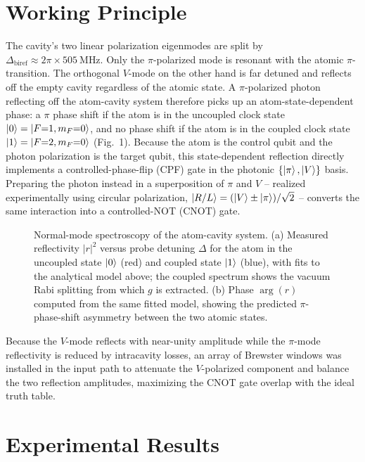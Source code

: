 \documentclass[10pt,a4paper]{article}
\begin{document}
\section*{Working Principle}

The cavity's two linear polarization eigenmodes are split by $\Delta_{\text{biref}} \approx 2\pi\times\SI{505}{\mega\hertz}$. Only the $\pi$-polarized mode is resonant with the atomic $\pi$-transition. The orthogonal $V$-mode on the other hand is far detuned and reflects off the empty cavity regardless of the atomic state. A $\pi$-polarized photon reflecting off the atom-cavity system therefore picks up an atom-state-dependent phase: a $\pi$ phase shift if the atom is in the uncoupled clock state $\ket{0}=\ket{F{=}1,m_F{=}0}$, and no phase shift if the atom is in the coupled clock state $\ket{1}=\ket{F{=}2,m_F{=}0}$ (Fig.~1). Because the atom is the control qubit and the photon polarization is the target qubit, this state-dependent reflection directly implements a controlled-phase-flip (CPF) gate in the photonic $\{\ket{\pi},\ket{V}\}$ basis. Preparing the photon instead in a superposition of $\pi$ and $V$ -- realized experimentally using circular polarization, $\ket{R/L} = (\ket{V}\pm\ket{\pi})/\sqrt{2}$ -- converts the same interaction into a controlled-NOT (CNOT) gate.

\begin{figure}[!htb]
	\centering
	
	\caption{Normal-mode spectroscopy of the atom-cavity system. (a) Measured reflectivity $|r|^2$ versus probe detuning $\Delta$ for the atom in the uncoupled state $\ket{0}$ (red) and coupled state $\ket{1}$ (blue), with fits to the analytical model above; the coupled spectrum shows the vacuum Rabi splitting from which $g$ is extracted. (b) Phase $\arg(r)$ computed from the same fitted model, showing the predicted $\pi$-phase-shift asymmetry between the two atomic states.}
\end{figure}

Because the $V$-mode reflects with near-unity amplitude while the $\pi$-mode reflectivity is reduced by intracavity losses, an array of Brewster windows was installed in the input path to attenuate the $V$-polarized component and balance the two reflection amplitudes, maximizing the CNOT gate overlap with the ideal truth table.

\section*{Experimental Results}
\end{document}
